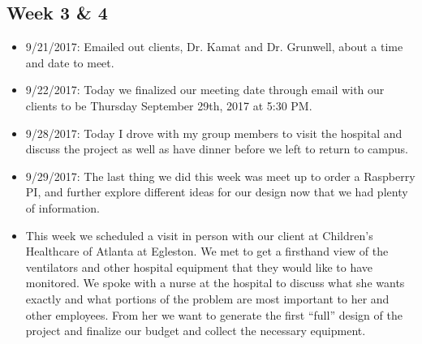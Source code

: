 \documentclass[12pt]{article}
\begin{document}
	\subsection{Week 3 \& 4}
		\begin{itemize}
			\item 9/21/2017: Emailed out clients, Dr. Kamat and Dr. Grunwell, about a time and date to meet.
			\item 9/22/2017: Today we finalized our meeting date through email with our clients to be Thursday September 29th, 2017 at 5:30 PM.
			\item 9/28/2017: Today I drove with my group members to visit the hospital and discuss the project as well as have dinner before we left to return to campus.
			\item 9/29/2017: The last thing we did this week was meet up to order a Raspberry PI, and further explore different ideas for our design now that we had plenty of information.
			\item This week we scheduled a visit in person with our client at Children’s Healthcare of Atlanta at Egleston. We met to get a firsthand view of the ventilators and other hospital equipment that they would like to have monitored. We spoke with a nurse at the hospital to discuss what she wants exactly and what portions of the problem are most important to her and other employees. From her we want to generate the first “full” design of the project and finalize our budget and collect the necessary equipment.
		\end{itemize}
		
\end{document}
